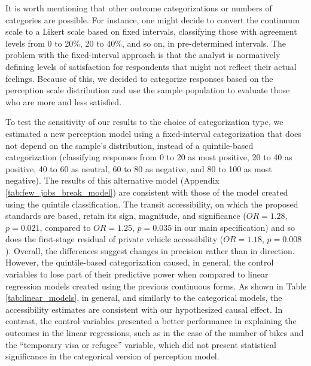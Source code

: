 \documentclass[preprint, 3p,
authoryear]{elsarticle} %
\begin{document}
It is worth mentioning that other outcome categorizations or numbers of
categories are possible. For instance, one might decide to convert the
continuum scale to a Likert scale based on fixed intervals, classifying
those with agreement levels from 0 to 20\%, 20 to 40\%, and so on, in
pre-determined intervals. The problem with the fixed-interval approach
is that the analyst is normatively defining levels of satisfaction for
respondents that might not reflect their actual feelings. Because of
this, we decided to categorize responses based on the perception scale
distribution and use the sample population to evaluate those who are
more and less satisfied.

To test the sensitivity of our results to the choice of categorization
type, we estimated a new perception model using a fixed-interval
categorization that does not depend on the sample's distribution,
instead of a quintile-based categorization (classifying responses from 0
to 20 as most positive, 20 to 40 as positive, 40 to 60 as neutral, 60 to
80 as negative, and 80 to 100 as most negative). The results of this
alternative model (Appendix \ref{tab:few_jobs_break_model}) are
consistent with those of the model created using the quintile
classification. The transit accessibility, on which the proposed
standards are based, retain its sign, magnitude, and significance
(\(OR = 1.28\), \(p = 0.021\), compared to \(OR = 1.25\), \(p = 0.035\)
in our main specification) and so does the first-stage residual of
private vehicle accessibility (\(OR = 1.18\), \(p = 0.008\)). Overall,
the differences suggest changes in precision rather than in direction.
However, the quintile-based categorization caused, in general, the
control variables to lose part of their predictive power when compared
to linear regression models created using the previous continuous forms.
As shown in Table \ref{tab:linear_models}, in general, and similarly to
the categorical models, the accessibility estimates are consistent with
our hypothesized causal effect. In contrast, the control variables
presented a better performance in explaining the outcomes in the linear
regressions, such as in the case of the number of bikes and the
``temporary visa or refugee'' variable, which did not present
statistical significance in the categorical version of perception model.
\end{document}
